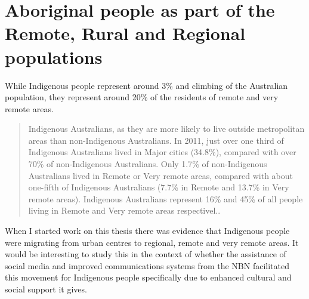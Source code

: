 \section{Aboriginal people as part of the Remote, Rural and Regional populations}
While Indigenous people represent around 3\% and climbing of the Australian population, they represent around 20\% of the residents of remote and very remote areas.


\begin{quotation}
Indigenous Australians, as they are more likely to live outside metropolitan areas than non-Indigenous Australians. In 2011, just over one third of Indigenous Australians lived in Major cities (34.8\%), compared with over 70\% of non-Indigenous
Australians. Only 1.7\% of non-Indigenous Australians lived in Remote or Very remote areas, compared with
about one-fifth of Indigenous Australians (7.7\% in Remote and 13.7\% in Very remote areas). Indigenous
Australians represent 16\% and 45\% of all people living in Remote and Very remote areas respectivel.\cite{RefWorks:446}.
\end{quotation}

When I started work on this thesis there was evidence that Indigenous people were migrating from urban centres to regional, remote and very remote areas. It would be interesting to study this in the context of whether the assistance of social media and improved communications systems from the NBN facilitated this movement for Indigenous people specifically due to enhanced cultural and social support it gives.

